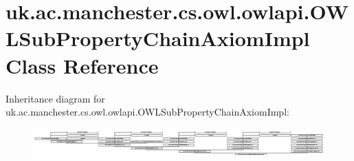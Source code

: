 \hypertarget{classuk_1_1ac_1_1manchester_1_1cs_1_1owl_1_1owlapi_1_1_o_w_l_sub_property_chain_axiom_impl}{\section{uk.\-ac.\-manchester.\-cs.\-owl.\-owlapi.\-O\-W\-L\-Sub\-Property\-Chain\-Axiom\-Impl Class Reference}
\label{classuk_1_1ac_1_1manchester_1_1cs_1_1owl_1_1owlapi_1_1_o_w_l_sub_property_chain_axiom_impl}
}
Inheritance diagram for uk.\-ac.\-manchester.\-cs.\-owl.\-owlapi.\-O\-W\-L\-Sub\-Property\-Chain\-Axiom\-Impl\-:\begin{figure}[H]
\begin{center}
\leavevmode
\includegraphics[height=1.133890cm]{classuk_1_1ac_1_1manchester_1_1cs_1_1owl_1_1owlapi_1_1_o_w_l_sub_property_chain_axiom_impl}
\end{center}
\end{figure}
